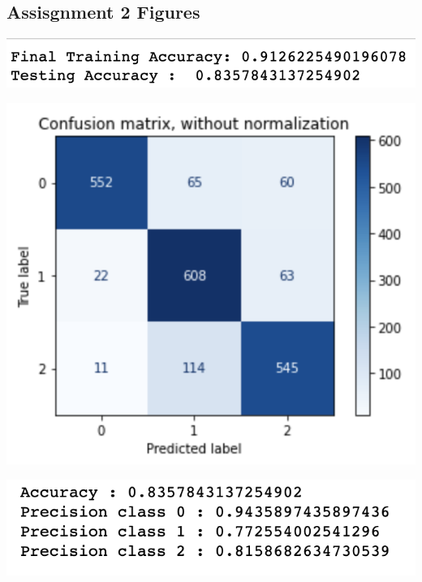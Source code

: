 \documentclass[12pt]{article}
\begin{document}
\begin{multicols*}{2}
  \subsection{Assisgnment 2 Figures} 
  \begin{center}
		\includegraphics[scale=0.5]{../screenshot/Rf-Overlapping012/score.png}

		\includegraphics[scale=0.5]{../screenshot/Rf-Overlapping012/cf.png}

		\includegraphics[scale=0.5]{../screenshot/Rf-Overlapping012/calc_result.png}
  \end{center}


\end{multicols*}

		

	
\end{document}
